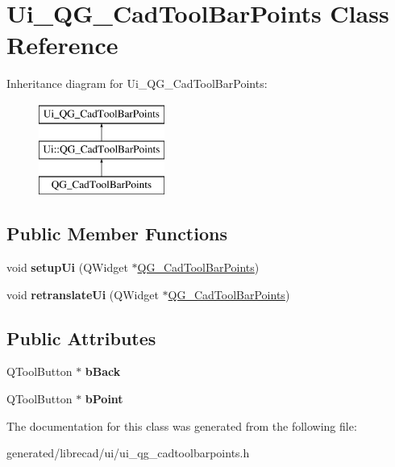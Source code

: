\hypertarget{classUi__QG__CadToolBarPoints}{\section{Ui\-\_\-\-Q\-G\-\_\-\-Cad\-Tool\-Bar\-Points Class Reference}
\label{classUi__QG__CadToolBarPoints}
}
Inheritance diagram for Ui\-\_\-\-Q\-G\-\_\-\-Cad\-Tool\-Bar\-Points\-:\begin{figure}[H]
\begin{center}
\leavevmode
\includegraphics[height=3.000000cm]{classUi__QG__CadToolBarPoints}
\end{center}
\end{figure}
\subsection*{Public Member Functions}
\begin{DoxyCompactItemize}
\item 
\hypertarget{classUi__QG__CadToolBarPoints_a4fe5ba78f7452d21f9d7b240704b6a4f}{void {\bfseries setup\-Ui} (Q\-Widget $\ast$\hyperlink{classQG__CadToolBarPoints}{Q\-G\-\_\-\-Cad\-Tool\-Bar\-Points})}\label{classUi__QG__CadToolBarPoints_a4fe5ba78f7452d21f9d7b240704b6a4f}

\item 
\hypertarget{classUi__QG__CadToolBarPoints_a54ea857252acbfad6e1fb296f5877f1e}{void {\bfseries retranslate\-Ui} (Q\-Widget $\ast$\hyperlink{classQG__CadToolBarPoints}{Q\-G\-\_\-\-Cad\-Tool\-Bar\-Points})}\label{classUi__QG__CadToolBarPoints_a54ea857252acbfad6e1fb296f5877f1e}

\end{DoxyCompactItemize}
\subsection*{Public Attributes}
\begin{DoxyCompactItemize}
\item 
\hypertarget{classUi__QG__CadToolBarPoints_aff0cea73b206f764b1d0cc70130447a0}{Q\-Tool\-Button $\ast$ {\bfseries b\-Back}}\label{classUi__QG__CadToolBarPoints_aff0cea73b206f764b1d0cc70130447a0}

\item 
\hypertarget{classUi__QG__CadToolBarPoints_a4ba4c6e8ff94e9ed1339a15256805ae1}{Q\-Tool\-Button $\ast$ {\bfseries b\-Point}}\label{classUi__QG__CadToolBarPoints_a4ba4c6e8ff94e9ed1339a15256805ae1}

\end{DoxyCompactItemize}


The documentation for this class was generated from the following file\-:\begin{DoxyCompactItemize}
\item 
generated/librecad/ui/ui\-\_\-qg\-\_\-cadtoolbarpoints.\-h\end{DoxyCompactItemize}
